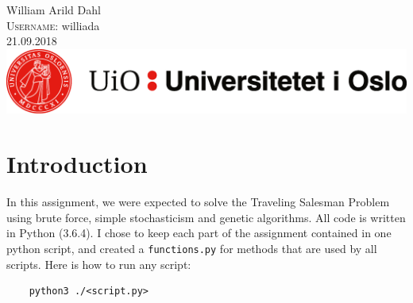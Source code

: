 \documentclass[a4paper, norsk, 12pt]{article}
\begin{document}
\begin{titlepage}
William Arild Dahl\\ %
\textsc{Username:} williada\\[3cm]




{\large 21.09.2018}\\[2cm] %


\includegraphics[width=1\textwidth]{uio_banner.png}\\[1cm] %


\vfill %
\end{titlepage}


\section{Introduction}

In this assignment, we were expected to solve the Traveling Salesman Problem using brute force, simple stochasticism and genetic algorithms. All code is written in Python (3.6.4). 
I chose to keep each part of the assignment contained in one python script, and created a \texttt{functions.py} for methods that are used by all scripts. Here is how to run any script:\newline\newline 
	\begin{lstlisting}
	python3 ./<script.py>
	
	\end{lstlisting}
\end{document}
